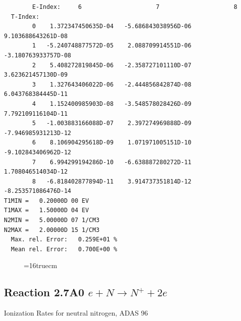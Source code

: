 \documentclass[12pt,dvipdfmx]{article}
\begin{document}
\begin{small}
\begin{verbatim}
        E-Index:     6                     7                     8
  T-Index:
        0    1.372347450635D-04   -5.686843038956D-06    9.103688643261D-08
        1   -5.240748877572D-05    2.088709914551D-06   -3.180763933757D-08
        2    5.408272819845D-06   -2.358727101110D-07    3.623621457130D-09
        3    1.327643406022D-06   -2.444856842874D-08    6.043768384445D-11
        4    1.152400985903D-08   -3.548578028426D-09    7.792109116104D-11
        5   -1.003883166088D-07    2.397274969888D-09   -7.946985931213D-12
        6    8.106904295618D-09    1.071971005151D-10   -9.102843406962D-12
        7    6.994299194286D-10   -6.638887280272D-11    1.708046514034D-12
        8   -6.818402877894D-11    3.914737351814D-12   -8.253571086476D-14
T1MIN =   0.20000D 00 EV
T1MAX =   1.50000D 04 EV
N2MIN =   5.00000D 07 1/CM3
N2MAX =   2.00000D 15 1/CM3
  Max. rel. Error:   0.259E+01 %
  Mean rel. Error:   0.700E+00 %
\end{verbatim}\end{small}

\begin{figure} \label{2.6A0}
\epsfxsize=16truecm
\end{figure}
\newpage

\subsection{
Reaction 2.7A0 $e + N \rightarrow N^+  + 2e $ }
  Ionization Rates for neutral  nitrogen,   ADAS 96
\end{document}
